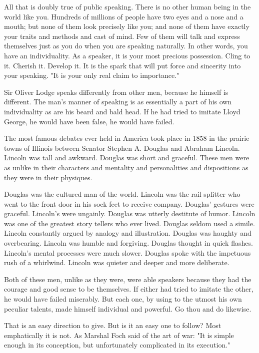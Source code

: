 \documentclass[10pt]{article}
\begin{document}
All that is doubly true of public speaking. There is no other human being in the world like you. Hundreds of millions of people have two eyes and a nose and a mouth; but none of them look precisely like you; and none of them have exactly your traits and methods and cast of mind. Few of them will talk and express themselves just as you do when you are speaking naturally. In other words, you have an individuality. As a speaker, it is your most precious possession. Cling to it. Cherish it. Develop it. It is the spark that will put force and sincerity into your speaking. "It is your only real claim to importance."

Sir Oliver Lodge speaks differently from other men, because he himself is different. The man's manner of speaking is as essentially a part of his own individuality as are his beard and bald head. If he had tried to imitate Lloyd George, he would have been false, he would have failed.

The most famous debates ever held in America took place in 1858 in the prairie towns of Illinois between Senator Stephen A. Douglas and Abraham Lincoln. Lincoln was tall and awkward. Douglas was short and graceful. These men were as unlike in their characters and mentality and personalities and dispositions as they were in their physiques.

Douglas was the cultured man of the world. Lincoln was the rail splitter who went to the front door in his sock feet to receive company. Douglas' gestures were graceful. Lincoln's were ungainly. Douglas was utterly destitute of humor. Lincoln was one of the greatest story tellers who ever lived. Douglas seldom used a simile. Lincoln constantly argued by analogy and illustration. Douglas was haughty and overbearing. Lincoln was humble and forgiving. Douglas thought in quick flashes. Lincoln's mental processes were much slower. Douglas spoke with the impetuous rush of a whirlwind. Lincoln was quieter and deeper and more deliberate.

Both of these men, unlike as they were, were able speakers because they had the courage and good sense to be themselves. If either had tried to imitate the other, he would have failed miserably. But each one, by using to the utmost his own peculiar talents, made himself individual and powerful. Go thou and do likewise.

That is an easy direction to give. But is it an easy one to follow? Most emphatically it is not. As Marshal Foch said of the art of war: "It is simple enough in its conception, but unfortunately complicated in its execution."
\end{document}
